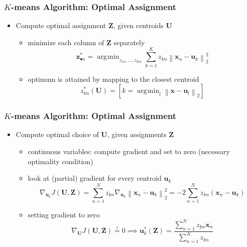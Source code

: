 \documentclass[11pt,a4paper,technote]{IEEEtran}
\DeclareMathOperator*{\argmin}{\arg\!\min}
\newcommand{\iver}[1]{\left[#1\right]}
\newcommand{\norm}[1]{\left\lVert#1\right\rVert}
\newcommand{\matr}[1]{\boldsymbol{\mathbf{#1}}}
\newcommand{\vect}[1]{\boldsymbol{\mathbf{#1}}}
\begin{document}
\subsubsection*{$K$-means Algorithm: Optimal Assignment}
\begin{itemize}
  \item Compute optimal assignment $\matr{Z}$, given centroids $\matr{U}$
    \begin{itemize}
      \item minimize each column of $\matr{Z}$ separately
        \[
          \vect{z}_{\bullet n}^* = \argmin_{z_{1n},\ldots,z_{Kn}} \sum_{k=1}^K
          z_{kn} \norm{\vect{x}_n - \vect{u}_k}_2^2
        \]
      \item optimum is attained by mapping to the closest centroid
        \[
          z_{kn}^*(\matr{U}) = \iver{k = \argmin_l \norm{\vect{x} - \vect{u}_l}_2}
        \]
    \end{itemize}
\end{itemize}

\subsubsection*{$K$-means Algorithm: Optimal Assignment}
\begin{itemize}
  \item Compute optimal choice of $\matr{U}$, given assignments $\matr{Z}$
    \begin{itemize}
      \item continuous variables: compute gradient and set to zero (necessary
        optimality condition)
      \item look at (partial) gradient for every centroid $\vect{u}_k$
        \[
          \nabla_{\vect{u}_k} J(\matr{U},\matr{Z}) = \sum_{n=1}^N z_{kn}
          \nabla_{\vect{u}_k} \norm{\vect{x}_n - \vect{u}_k}_2^2 = -2
          \sum_{n=1}^N z_{kn} (\vect{x}_n - \vect{u}_k)
        \]
      \item setting gradient to zero
        \[
          \nabla_{\matr{U}} J(\matr{U},\matr{Z}) \stackrel{!}{=} 0 \implies
          \vect{u}_k^*(\matr{Z}) = \frac{\sum_{n=1}^N z_{kn} \vect{x}_n}
          {\sum_{n=1}^N z_{kn}} %
        \]
    \end{itemize}
\end{itemize}
\end{document}
